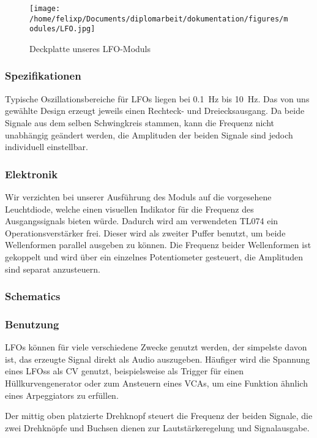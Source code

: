 \begin{figure}[htbp]
\centering
\texttt{[image: /home/felixp/Documents/diplomarbeit/dokumentation/figures/modules/LFO.jpg]}
\caption{Deckplatte unseres LFO-Moduls}
\end{figure}


\subsubsection{Spezifikationen}
\label{sec:org812a5e2}
Typische Oszillationsbereiche für \acp{LFO} liegen bei \SI{0.1}{\hertz} bis \SI{10}{\hertz}. Das  von uns gewählte Design erzeugt jeweils einen Rechteck- und Dreiecksausgang. Da beide Signale aus dem selben Schwingkreis stammen, kann die Frequenz nicht unabhängig geändert werden, die Amplituden der beiden Signale sind jedoch individuell einstellbar.

\subsubsection{Elektronik}
\label{sec:org08d19c6}
Wir verzichten bei unserer Ausführung des Moduls auf die vorgesehene Leuchtdiode, welche einen visuellen Indikator für die Frequenz des Ausgangssignals bieten würde. Dadurch wird am verwendeten TL074 ein Operationsverstärker frei. Dieser wird als zweiter Puffer benutzt, um beide Wellenformen parallel ausgeben zu können. Die Frequenz beider Wellenformen ist gekoppelt und wird über ein einzelnes Potentiometer gesteuert, die Amplituden sind separat anzusteuern.

\subsubsection{Schematics}
\label{sec:org5598e56}

\subsubsection{Benutzung}
\label{sec:org097cfa5}
\acp{LFO} können für viele verschiedene Zwecke genutzt werden, der simpelste davon ist, das erzeugte Signal direkt als Audio auszugeben. Häufiger wird die Spannung eines \acp{LFO}s als \acl{CV} genutzt, beispielsweise als Trigger für einen Hüllkurvengenerator oder zum Ansteuern eines \acp{VCA}, um eine Funktion ähnlich eines Arpeggiators zu erfüllen.

Der mittig oben platzierte Drehknopf steuert die Frequenz der beiden Signale, die zwei Drehknöpfe und Buchsen dienen zur Lautstärkeregelung und Signalausgabe.
